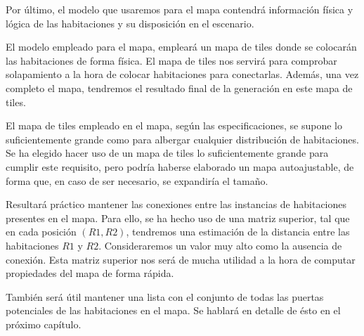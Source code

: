 Por último, el modelo que usaremos para el mapa contendrá información física y lógica de las habitaciones y su disposición en el escenario.

El modelo empleado para el mapa, empleará un mapa de tiles donde se colocarán las habitaciones de forma física. El mapa de tiles nos servirá para comprobar solapamiento a la hora de colocar habitaciones para conectarlas. Además, una vez completo el mapa, tendremos el resultado final de la generación en este mapa de tiles. 

El mapa de tiles empleado en el mapa, según las especificaciones, se supone lo suficientemente grande como para albergar cualquier distribución de habitaciones. Se ha elegido hacer uso de un mapa de tiles lo suficientemente grande para cumplir este requisito, pero podría haberse elaborado un mapa autoajustable, de forma que, en caso de ser necesario, se expandiría el tamaño.

 \label{uppermatsec}
Resultará práctico mantener las conexiones entre las instancias de habitaciones presentes en el mapa. Para ello, se ha hecho uso de una matriz superior, tal que en cada posición $(R1,R2)$, tendremos una estimación de la distancia entre las habitaciones $R1$ y $R2$. Consideraremos un valor muy alto como la ausencia de conexión. Esta matriz superior nos será de mucha utilidad a la hora de computar propiedades del mapa de forma rápida.

También será útil mantener una lista con el conjunto de todas las puertas potenciales de las habitaciones en el mapa. Se hablará en detalle de ésto en el próximo capítulo.
